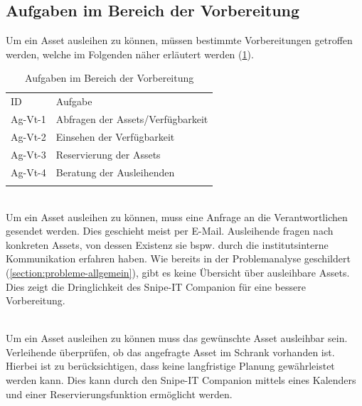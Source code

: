 \subsection{Aufgaben im Bereich der Vorbereitung}
Um ein Asset ausleihen zu können, müssen bestimmte Vorbereitungen getroffen werden, welche im
Folgenden näher erläutert werden (\ref{table:Ag-Vt}).

\begin{table}[h]
        \centering
        \caption{Aufgaben im Bereich der Vorbereitung}
        \begin{tabular}{ll}
                \arrayrulecolor{maincolor}\hline
                \sffamily\color{maincolor}ID & \sffamily\color{maincolor}Aufgabe \\
                \arrayrulecolor{maincolor}\hline
                Ag-Vt-1                      & Abfragen der Assets/Verfügbarkeit    \\
                Ag-Vt-2                       & Einsehen der Verfügbarkeit        \\
                Ag-Vt-3                      & Reservierung der Assets           \\
                Ag-Vt-4                      & Beratung der Ausleihenden         \\
                \arrayrulecolor{maincolor}\hline
        \end{tabular}
        \label{table:Ag-Vt}
\end{table}

{\sffamily\color{maincolor}{Ag-Vt-1 | Abfragen der Assets/Verfügbarkeit}}\\
Um ein Asset ausleihen zu können, muss eine Anfrage an die Verantwortlichen gesendet werden. Dies
geschieht meist per E-Mail. Ausleihende fragen nach konkreten Assets, von dessen Existenz sie bspw.
durch die institutsinterne Kommunikation erfahren haben. Wie bereits in der Problemanalyse
geschildert (\ref{section:probleme-allgemein}), gibt es keine Übersicht über ausleihbare Assets.
Dies zeigt die Dringlichkeit des Snipe-IT Companion für eine bessere Vorbereitung.

        {\sffamily\color{maincolor}{Ag-Vt-2 | Einsehen der Verfügbarkeit}}\\
Um ein Asset ausleihen zu können muss das gewünschte Asset ausleihbar sein. Verleihende überprüfen,
ob das angefragte Asset im Schrank vorhanden ist. Hierbei ist zu berücksichtigen, dass keine
langfristige Planung gewährleistet werden kann. Dies kann durch den Snipe-IT Companion mittels eines
Kalenders und einer Reservierungsfunktion ermöglicht werden.

